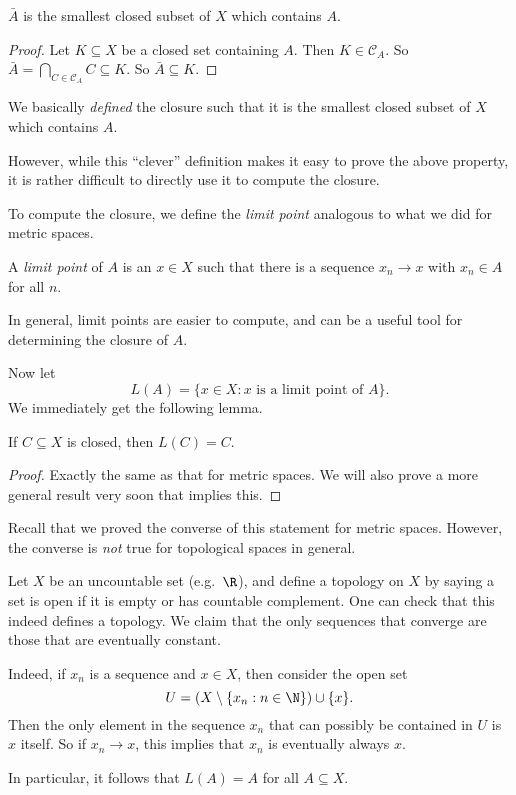 \documentclass[a4paper]{article}
\begin{document}
\begin{prop}
  $\bar A$ is the smallest closed subset of $X$ which contains $A$.
\end{prop}

\begin{proof}
  Let $K\subseteq X$ be a closed set containing $A$. Then $K\in \mathcal{C}_A$. So $\bar A = \bigcap_{C\in \mathcal{C}_A}C \subseteq K$. So $\bar A\subseteq K$.
\end{proof}

We basically \emph{defined} the closure such that it is the smallest closed subset of $X$ which contains $A$.

However, while this ``clever'' definition makes it easy to prove the above property, it is rather difficult to directly use it to compute the closure.

To compute the closure, we define the \emph{limit point} analogous to what we did for metric spaces.
\begin{defi}
  A \emph{limit point} of $A$ is an $x\in X$ such that there is a sequence $x_n \to x$ with $x_n \in A$ for all $n$.
\end{defi}
In general, limit points are easier to compute, and can be a useful tool for determining the closure of $A$.

Now let
\[
  L(A) = \{x\in X: x\text{ is a limit point of }A\}.
\]
We immediately get the following lemma.
\begin{lemma}
  If $C\subseteq X$ is closed, then $L(C) = C$.
\end{lemma}

\begin{proof}
  Exactly the same as that for metric spaces. We will also prove a more general result very soon that implies this.
\end{proof}

Recall that we proved the converse of this statement for metric spaces. However, the converse is \emph{not} true for topological spaces in general.

\begin{eg}
  Let $X$ be an uncountable set (e.g.\ $\R$), and define a topology on $X$ by saying a set is open if it is empty or has countable complement. One can check that this indeed defines a topology. We claim that the only sequences that converge are those that are eventually constant.

  Indeed, if $x_n$ is a sequence and $x \in X$, then consider the open set
  \[
    U = (X \setminus \{x_n: n \in \N\}) \cup \{x\}.
  \]
  Then the only element in the sequence $x_n$ that can possibly be contained in $U$ is $x$ itself. So if $x_n \to x$, this implies that $x_n$ is eventually always $x$.

  In particular, it follows that $L(A) = A$ for all $A \subseteq X$.
\end{eg}
\end{document}

